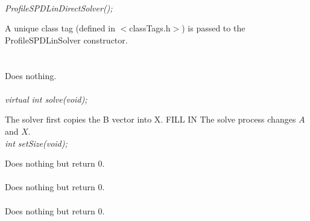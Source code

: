   \\
{\em ProfileSPDLinDirectSolver();}  

A unique class tag (defined in $<$classTags.h$>$) is passed to the
ProfileSPDLinSolver constructor. \\


 \\
\\ 
Does nothing. \\

  \\
{\em virtual int solve(void);} 

The solver first copies the B vector into X.
FILL IN
The solve process changes $A$ and $X$. \\   


{\em int setSize(void);} 

Does nothing but return $0$. \\

 \\ 
Does nothing but return $0$. \\

 \\ 
Does nothing but return $0$. \\







